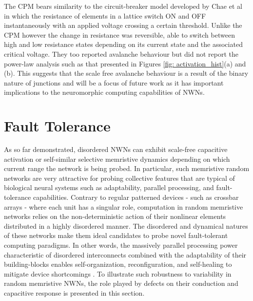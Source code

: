 
The CPM bears similarity to the circuit-breaker model developed by Chae et al\cite{chae2008} in which the resistance of elements in a lattice switch ON and OFF instantaneously with an applied voltage crossing a certain threshold. Unlike the CPM however the change in resistance was reversible, able to switch between high and low resistance states depending on its current state and the associated critical voltage. They too reported avalanche behaviour but did not report the power-law analysis such as that presented in Figures \ref{fig: activation_hist}(a) and (b). This suggests that the scale free avalanche behaviour is a result of the binary nature of junctions and will be a focus of future work as it has important implications to the neuromorphic computing capabilities of NWNs.
\section{Fault Tolerance}
\label{Sec: fault_tol}
As so far demonstrated, disordered NWNs can exhibit scale-free capacitive activation or self-similar selective memristive dynamics depending on which current range the network is being probed. In particular, such memristive random networks are very attractive for probing collective features that are typical of biological neural systems such as adaptability, parallel processing, and fault-tolerance capabilities. Contrary to regular patterned devices - such as crossbar arrays \cite{prezioso2015,kim2012} - where each unit has a singular role, computation in random memristive networks relies on the non-deterministic action of their nonlinear elements distributed in a highly disordered manner. The disordered and dynamical natures of these networks make them ideal candidates to probe novel fault-tolerant computing paradigms. In other words, the massively parallel processing power characteristic of disordered interconnects combined with the adaptability of their building-blocks enables self-organization, reconfiguration, and self-healing to mitigate device shortcomings \cite{snider2007}. To illustrate such robustness to variability in random memristive NWNs, the role played by defects on their conduction and capacitive response is presented in this section.

